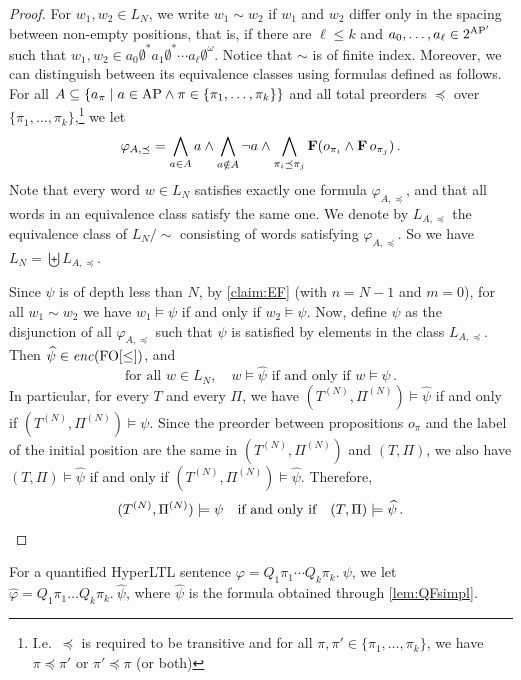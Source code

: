 \documentclass[dvipsnames,10pt,a4paper]{amsart}
\theoremstyle{definition}
\theoremstyle{remark}
\newcommand{\F}{\mathop{\mathbf{F}\vphantom{a}}\nolimits}
\newcommand{\hyltl}{{HyperLTL}\xspace}
\newcommand\FO{\textup{FO}}
\newcommand\simpleHyperLTL{\encPhi {\FOw}}
\newcommand\AP{\textup{AP}}
\newcommand\FOw{\FO[\le]}
\newcommand\tn[2]{#1^{(#2)}}
\newcommand\nun[2]{#1^{(#2)}}
\newcommand\encPhi[1]{\mathit{enc}(#1)}
\newcommand\simpl[1]{\widehat {#1}}
\begin{document}
\begin{proof}
  For $w_1, w_2 \in L_N$, we write $w_1 \sim w_2$ if $w_1$ and $w_2$ differ
  only in the spacing between non-empty positions, that is, if there are
  $\ell \le k$ and $a_0, \ldots, a_\ell \in 2^{\AP'}$ such that
  $w_1,w_2 \in a_0 \emptyset^\ast a_1 \emptyset^\ast \cdots a_\ell \emptyset^\omega$.    
  Notice that $\sim$ is of finite index.
  Moreover, we can distinguish between its equivalence classes using formulas
  defined as follows. For all
  $A \subseteq \{a_{\pi} \mid a \in \AP \land \pi \in \{\pi_1,\ldots,\pi_k\}\}$
  and all total preorders $\preceq$ over $\{\pi_1, \ldots, \pi_k\}$,\footnote{
    I.e.\ $\preceq$ is required to be transitive and for all
    $\pi,\pi' \in \{\pi_1, \ldots, \pi_k\}$, we have $\pi \preceq \pi'$
    or $\pi' \preceq \pi$ (or both)} we let
  \[
    \varphi_{A,\preceq} =
    \bigwedge_{a \in A} a \land \bigwedge_{a \notin A} \lnot a
    \land \bigwedge_{\pi_i \preceq \pi_j} \F(o_{\pi_i} \land \F o_{\pi_j})
    \, .
  \]
  Note that every word $w \in L_N$ satisfies exactly one formula
  $\varphi_{A,\preceq}$, and that all words in an equivalence class
  satisfy the same one.
  We denote by $L_{A,\preceq}$ the equivalence class of $L_N/{\sim}$
  consisting of words satisfying $\varphi_{A,\preceq}$.
  So we have $L_N = \biguplus L_{A,\preceq}$.

  Since $\psi$ is of depth less than $N$, by \autoref{claim:EF}
  (with $n = N-1$ and $m = 0$), for all $w_1 \sim w_2$ we have
  $w_1 \models \psi$ if and only if $w_2 \models \psi$.
  Now, define $\simpl \psi$ as the disjunction of all $\varphi_{A,\preceq}$
  such that $\psi$ is satisfied by elements in the class $L_{A,\preceq}$.
  Then $\simpl \psi \in \simpleHyperLTL$, and
  \[
    \text{for all } w \in L_N, \quad w \models \simpl \psi
    \text{ if and only if } w \models \psi \, .
  \]
  In particular, for every $T$ and every $\Pi$, we have
  $(\tn T N,\nun \Pi N) \models \simpl \psi$ if and only if 
  $(\tn T N,\nun \Pi N) \models \psi$.
  Since the preorder between propositions $o_\pi$ and the label of the initial
  position are the same in $(\tn T N,\nun \Pi N)$ and $(T,\Pi)$,
  we also have $(T,\Pi) \models \simpl \psi$ if and only if
  $(\tn T N,\nun \Pi N) \models \simpl \psi$.
  Therefore,
  \[
(\tn T N, \nun \Pi N) \models \psi \quad\text{if and only if}\quad     (T,\Pi) \models \simpl \psi
     \, . \qedhere
  \]
\end{proof}

For a quantified \hyltl sentence $\varphi = Q_1\pi_1 \cdots Q_k\pi_k.\ \psi$, we let
$\simpl \varphi = Q_1\pi_1 \ldots Q_k\pi_k.\ \simpl \psi$, where $\simpl \psi$ is
the formula obtained through \autoref{lem:QFsimpl}.
\end{document}
